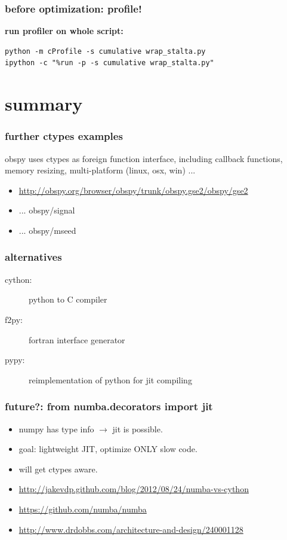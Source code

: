 \documentclass[utf8, compress, hyperref={pdftex=true,pdfpagemode=FullScreen}, graphicx={pdftex}]{beamer}
\begin{document}
\begin{frame}[fragile]
    \frametitle{before optimization: profile!}
    \textbf{run profiler on whole script:}
    \begin{lstlisting}
python -m cProfile -s cumulative wrap_stalta.py
ipython -c "%run -p -s cumulative wrap_stalta.py"
    \end{lstlisting}
\end{frame}

\section{summary}
\begin{frame}[fragile]
    \frametitle{further ctypes examples}
    obspy uses ctypes as foreign function interface, including callback
    functions, memory resizing, multi-platform (linux, osx, win) ...
    \begin{itemize}
    \item \url{http://obspy.org/browser/obspy/trunk/obspy.gse2/obspy/gse2}
    \item ... obspy/signal
    \item ... obspy/mseed
    \end{itemize}
\end{frame}

\begin{frame}[fragile]
    \frametitle{alternatives}
    \begin{description}
        \item[cython:] python to C compiler
        \item[f2py:] fortran interface generator
        \item[pypy:] reimplementation of python for jit compiling
    \end{description}
\end{frame}

\begin{frame}[fragile]
    \frametitle{future?: from numba.decorators import jit}
    \begin{itemize}
        \item numpy has type info $\rightarrow$ jit is possible.
        \item goal: lightweight JIT, optimize ONLY slow code.
        \item will get ctypes aware.
        \item \url{http://jakevdp.github.com/blog/2012/08/24/numba-vs-cython}
        \item \url{https://github.com/numba/numba}
        \item \url{http://www.drdobbs.com/architecture-and-design/240001128}
    \end{itemize}
\end{frame}
\end{document}
